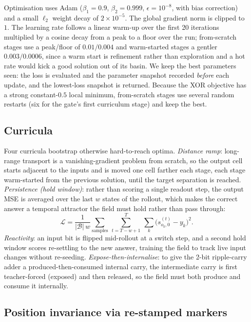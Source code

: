 Optimisation uses Adam ($\beta_1=0.9$, $\beta_2=0.999$, $\epsilon=10^{-8}$, with bias correction) and a small $\ell_2$ weight decay of $2\times10^{-5}$. The global gradient norm is clipped to $1$. The learning rate follows a linear warm-up over the first 20 iterations multiplied by a cosine decay from a peak to a floor over the run; from-scratch stages use a peak/floor of $0.01/0.004$ and warm-started stages a gentler $0.003/0.0006$, since a warm start is refinement rather than exploration and a hot rate would kick a good solution out of its basin. We keep the best parameters seen: the loss is evaluated and the parameter snapshot recorded \emph{before} each update, and the lowest-loss snapshot is returned. Because the XOR objective has a strong constant-$0.5$ local minimum, from-scratch stages use several random restarts (six for the gate's first curriculum stage) and keep the best.

\subsection*{Curricula}

Four curricula bootstrap otherwise hard-to-reach optima. \emph{Distance ramp}: long-range transport is a vanishing-gradient problem from scratch, so the output cell starts adjacent to the inputs and is moved one cell farther each stage, each stage warm-started from the previous solution, until the target separation is reached. \emph{Persistence (hold window)}: rather than scoring a single readout step, the output MSE is averaged over the last $w$ states of the rollout, which makes the correct answer a temporal attractor the field must hold rather than pass through:
\begin{equation}
\mathcal{L} = \frac{1}{|\mathcal{B}|\,w}\sum_{\text{samples}}\ \sum_{t=T-w+1}^{T}\ \sum_{k}\big(s^{(t)}_{o_k,0} - y_k\big)^2 .
\end{equation}
\emph{Reactivity}: an input bit is flipped mid-rollout at a switch step, and a second hold window scores re-settling to the new answer, training the field to track live input changes without re-seeding. \emph{Expose-then-internalise}: to give the 2-bit ripple-carry adder a produced-then-consumed internal carry, the intermediate carry is first teacher-forced (exposed) and then released, so the field must both produce and consume it internally.

\subsection*{Position invariance via re-stamped markers}

